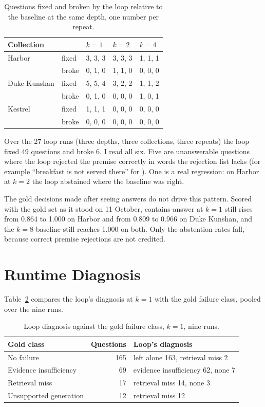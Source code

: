 \documentclass[12pt, a4paper, oneside]{report}
\newcommand{\code}[1]{\texttt{\detokenize{#1}}}
\begin{document}
\begin{table}[htbp]
\centering
\footnotesize
\begin{tabular}{@{}lllll@{}}
\toprule
Collection & & $k=1$ & $k=2$ & $k=4$ \\
\midrule
Harbor & fixed & 3, 3, 3 & 3, 3, 3 & 1, 1, 1 \\
       & broke & 0, 1, 0 & 1, 1, 0 & 0, 0, 0 \\
Duke Kunshan & fixed & 5, 5, 4 & 3, 2, 2 & 1, 1, 2 \\
             & broke & 0, 1, 0 & 0, 0, 0 & 1, 0, 1 \\
Kestrel & fixed & 1, 1, 1 & 0, 0, 0 & 0, 0, 0 \\
        & broke & 0, 0, 0 & 0, 0, 0 & 0, 0, 0 \\
\bottomrule
\end{tabular}
\caption{Questions fixed and broken by the loop relative to the baseline at
the same depth, one number per repeat.}
\label{tbl:fixbreak}
\end{table}

Over the 27 loop runs (three depths, three collections, three repeats) the
loop fixed 49 questions and broke 6. I read all six. Five are unanswerable
questions where the loop rejected the premise correctly in words the
rejection list lacks (for example ``breakfast is not served there'' for
\code{dku-032}). One is a real regression: on Harbor \code{seed-007} at
$k=2$ the loop abstained where the baseline was right.

The gold decisions made after seeing answers do not drive this pattern.
Scored with the gold set as it stood on 11 October, contains-answer at
$k=1$ still rises from 0.864 to 1.000 on Harbor and from 0.809 to 0.966 on
Duke Kunshan, and the $k=8$ baseline still reaches 1.000 on both. Only the
abstention rates fall, because correct premise rejections are not credited.

\section{Runtime Diagnosis}

Table~\ref{tbl:diagnosis} compares the loop's diagnosis at $k=1$ with the
gold failure class, pooled over the nine runs.

\begin{table}[htbp]
\centering
\footnotesize
\begin{tabular}{@{}lrl@{}}
\toprule
Gold class & Questions & Loop's diagnosis \\
\midrule
No failure & 165 & left alone 163, retrieval miss 2 \\
Evidence insufficiency & 69 & evidence insufficiency 62, none 7 \\
Retrieval miss & 17 & retrieval miss 14, none 3 \\
Unsupported generation & 12 & retrieval miss 12 \\
\bottomrule
\end{tabular}
\caption{Loop diagnosis against the gold failure class, $k=1$, nine runs.}
\label{tbl:diagnosis}
\end{table}
\end{document}
